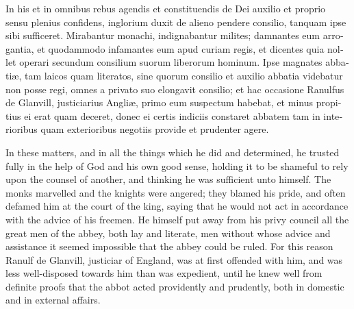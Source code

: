 \documentclass[10pt]{book}
\begin{document}
\begin{paracol}{2}
\switchcolumn*

\begin{otherlanguage}{latin}
In his et in omnibus rebus agendis et constituendis de Dei auxilio et proprio sensu plenius confidens, inglorium duxit de alieno pendere consilio, tanquam ipse sibi sufficeret. Mirabantur monachi, indignabantur milites; damnantes eum arrogantia, et quodammodo infamantes eum apud curiam regis, et dicentes quia nollet operari secundum consilium suorum liberorum hominum. Ipse magnates abbati\ae{}, tam laicos quam literatos, sine quorum consilio et auxilio abbatia videbatur non posse regi, omnes a privato suo elongavit consilio; et hac occasione Ranulfus de Glanvill, justiciarius Angli\ae{}, primo eum suspectum habebat, et minus propitius ei erat quam deceret, donec ei certis indiciis constaret abbatem tam in interioribus quam exterioribus negotiis provide et prudenter agere.
\end{otherlanguage}

\switchcolumn

In these matters, and in all the things which he did and determined, he trusted fully in the help of God and his own good sense, holding it to be shameful to rely upon the counsel of another, and thinking he was sufficient unto himself. The monks marvelled and the knights were angered; they blamed his pride, and often defamed him at the court of the king, saying that he would not act in accordance with the advice of his freemen. He himself put away from his privy council all the great men of the abbey, both lay and literate, men without whose advice and assistance it seemed impossible that the abbey could be ruled. For this reason Ranulf de Glanvill, justiciar of England, was at first offended with him, and was less well-disposed towards him than was expedient, until he knew well from definite proofs that the abbot acted providently and prudently, both in domestic and in external affairs.

\switchcolumn*


\end{paracol}
\end{document}
